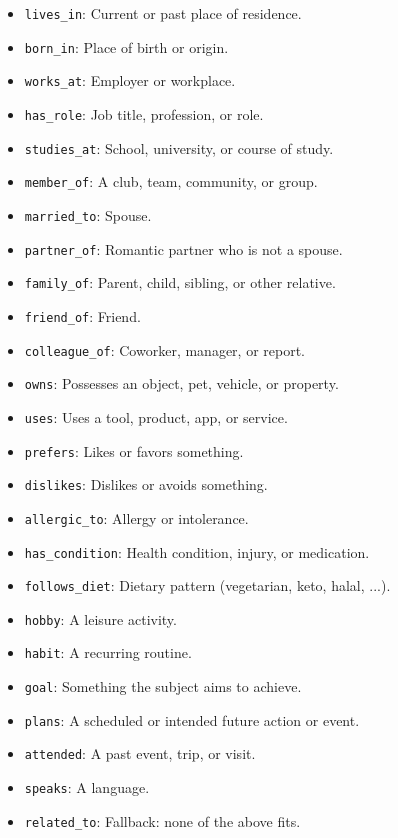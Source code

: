 \documentclass[11pt]{article}
\begin{document}
\begin{itemize}
\item \texttt{lives\_\allowbreak{}in}: Current or past place of residence.
\item \texttt{born\_\allowbreak{}in}: Place of birth or origin.
\item \texttt{works\_\allowbreak{}at}: Employer or workplace.
\item \texttt{has\_\allowbreak{}role}: Job title, profession, or role.
\item \texttt{studies\_\allowbreak{}at}: School, university, or course of study.
\item \texttt{member\_\allowbreak{}of}: A club, team, community, or group.
\item \texttt{married\_\allowbreak{}to}: Spouse.
\item \texttt{partner\_\allowbreak{}of}: Romantic partner who is not a spouse.
\item \texttt{family\_\allowbreak{}of}: Parent, child, sibling, or other relative.
\item \texttt{friend\_\allowbreak{}of}: Friend.
\item \texttt{colleague\_\allowbreak{}of}: Coworker, manager, or report.
\item \texttt{owns}: Possesses an object, pet, vehicle, or property.
\item \texttt{uses}: Uses a tool, product, app, or service.
\item \texttt{prefers}: Likes or favors something.
\item \texttt{dislikes}: Dislikes or avoids something.
\item \texttt{allergic\_\allowbreak{}to}: Allergy or intolerance.
\item \texttt{has\_\allowbreak{}condition}: Health condition, injury, or medication.
\item \texttt{follows\_\allowbreak{}diet}: Dietary pattern (vegetarian, keto, halal, ...).
\item \texttt{hobby}: A leisure activity.
\item \texttt{habit}: A recurring routine.
\item \texttt{goal}: Something the subject aims to achieve.
\item \texttt{plans}: A scheduled or intended future action or event.
\item \texttt{attended}: A past event, trip, or visit.
\item \texttt{speaks}: A language.
\item \texttt{related\_\allowbreak{}to}: Fallback: none of the above fits.
\end{itemize}
\end{document}
